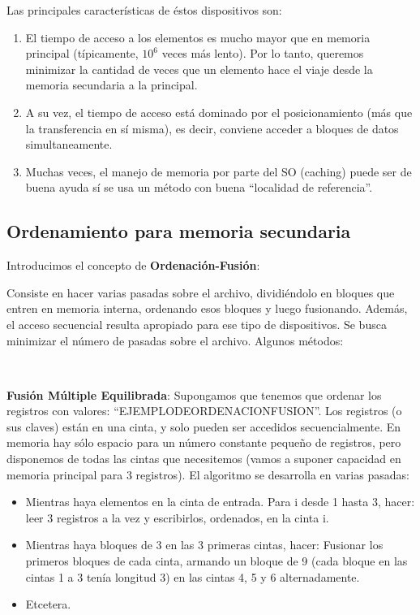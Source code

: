 Las principales caracter\'isticas de \'estos dispositivos son:
 \begin{enumerate}
  \item El tiempo de acceso a los elementos es mucho mayor que en memoria principal (t\'ipicamente, $10^6$ veces m\'as lento). Por lo tanto, queremos minimizar la cantidad de veces que un elemento hace el viaje desde la memoria secundaria a la principal.
  \item A su vez, el tiempo de acceso est\'a dominado por el posicionamiento (m\'as que la transferencia en s\'i misma), es decir, conviene acceder a bloques de datos simultaneamente. 
  \item Muchas veces, el manejo de memoria por parte del SO (caching) puede ser de buena ayuda s\'i se usa un m\'etodo con buena ``localidad de referencia''.
 \end{enumerate}

\subsection{Ordenamiento para memoria secundaria}

Introducimos el concepto de \textbf{Ordenaci\'on-Fusi\'on}:

Consiste en hacer varias pasadas sobre el archivo, dividi\'endolo en bloques que entren en memoria interna, ordenando esos bloques y luego fusionando. Adem\'as, el acceso secuencial resulta apropiado para ese tipo de dispositivos. Se busca minimizar el n\'umero de pasadas sobre el archivo.
Algunos m\'etodos:

~

\textbf{Fusi\'on M\'ultiple Equilibrada}: Supongamos que tenemos que ordenar los registros con valores: ``EJEMPLODEORDENACIONFUSION''.
Los registros (o sus claves) est\'an en una cinta, y solo pueden ser accedidos secuencialmente. En memoria hay s\'olo espacio para un n\'umero constante pequeño de registros, pero disponemos de todas las cintas que necesitemos (vamos a suponer capacidad en memoria principal para 3 registros).
El algoritmo se desarrolla en varias pasadas:
 \begin{itemize}
  \item Mientras haya elementos en la cinta de entrada. Para i desde 1 hasta 3, hacer: leer 3 registros a la vez y escribirlos, ordenados, en la cinta i.
  \item Mientras haya bloques de 3 en las 3 primeras cintas, hacer: Fusionar los primeros bloques de cada cinta, armando un bloque de 9 (cada bloque en las cintas 1 a 3 ten\'ia longitud 3) en las cintas 4, 5 y 6 alternadamente.
  \item Etcetera.
 \end{itemize}

